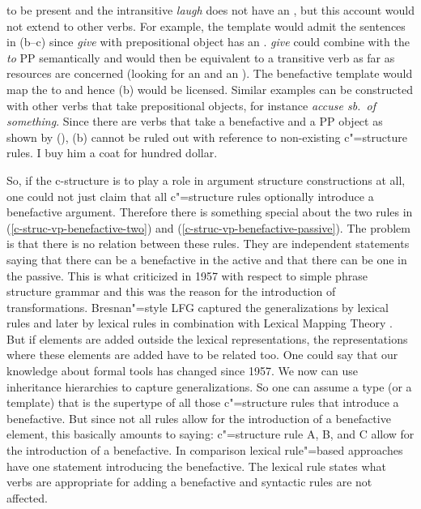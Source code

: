 \argtwo to be present and the intransitive \emph{laugh} does not have an \argtwo, but this account
would not extend to other verbs. For example, the template would admit the sentences in (b--c) since \emph{give} with
prepositional object has an \argtwo \citep[]{Kibort2008a}.
\eal
{}
\zl
\emph{give} could combine with the \emph{to} PP semantically and would then be equivalent to a
transitive verb as far as resources are concerned (looking for an \argone and an \argtwo). The
benefactive template would map the \argtwo to \argthree and hence (b) would be
licensed. Similar examples can be constructed with other verbs that take prepositional objects, for
instance \emph{accuse sb.\ of something}.
Since there are verbs that take a benefactive and a PP object as shown by (), (b) cannot be ruled out
with reference to non-existing c"=structure rules.
\ea
I buy him a coat for hundred dollar.
\z

So, if the c-structure is to play a role in argument structure constructions at all, one could not
just claim that all c"=structure rules optionally introduce a benefactive argument. Therefore there is something special about the two rules in (\ref{c-struc-vp-benefactive-two})
and (\ref{c-struc-vp-benefactive-passive}). The problem is that there is no relation between these
rules. They are independent statements saying that there can be a benefactive in the active and that
there can be one in the passive. This is what \citet[]{Chomsky57a} criticized in 1957 with
respect to simple phrase structure grammar and
this was the reason for the introduction of transformations. Bresnan"=style LFG captured the
generalizations by lexical rules \citep{Bresnan78a,Bresnan82a} and later by lexical rules in combination with Lexical Mapping
Theory \citep{Toivonen2013a}. But if elements are added
outside the lexical representations, the representations where these elements are added 
have to be related too. One could say that our knowledge about formal tools has changed since
1957. We now can use inheritance hierarchies to capture generalizations. So one can assume a type
(or a template) that is the supertype of all those c"=structure rules that introduce a
benefactive. But since not all rules allow for the introduction of a benefactive element, this
basically amounts to saying: c"=structure rule A, B, and C allow for the introduction of a
benefactive. In comparison lexical rule"=based approaches have one statement introducing the
benefactive. The lexical rule states what verbs are appropriate for adding a benefactive and
syntactic rules are not affected.

